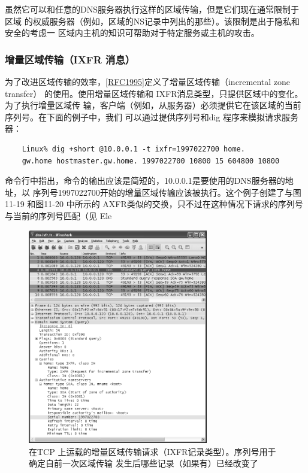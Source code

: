 虽然它可以和任意的DNS服务器执行这样的区域传输，但是它们现在通常限制于区域
的权威服务器（例如，区域的NS记录中列出的那些）。该限制是出于隐私和安全的考虑一
区域内主机的知识可帮助对于特定服务或主机的攻击。

\subsubsection{增量区域传输（IXFR 消息）}

为了改进区域传输的效率，\href{https://www.rfc-editor.org/rfc/rfc1995}{[RFC1995]}定义了增量区域传输（incremental
zone transfer）
的使用。使用增量区域传输和 IXFR消息类型，只提供区域中的变化。为了执行增量区域传
输，客户端（例如，从服务器）必须提供它在该区域的当前序列号。在下面的例子中，我们
可以通过提供序列号和dig 程序来模拟请求服务器：

\begin{verbatim}
    Linux% dig +short @10.0.0.1 -t ixfr=1997022700 home.
    gw.home hostmaster.gw.home. 1997022700 10800 15 604800 10800
\end{verbatim}

命令行中指出，命令的输出应该是简短的，10.0.0.1是要使用的DNS服务器的地址，以
序列号1997022700开始的增量区域传输应该被执行。这个例子创建了与图11-19 和图11-20
中所示的 AXFR类似的交换，只不过在这种情况下请求的序列号与当前的序列号匹配（见
Ele

\begin{figure}[!htb]
  \centering
  \includegraphics[width=0.7\textwidth]{imgs/11/11-21.png}
  \caption{在TCP 上运载的增量区域传输请求（IXFR记录类型）。序列号用于确定自前一次区域传输
  发生后哪些记录（如果有）已经改变了}
\end{figure}

